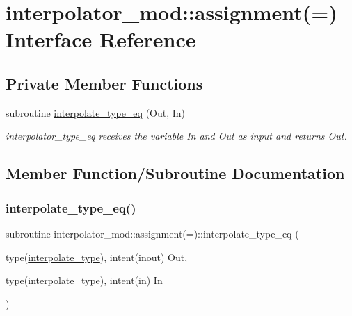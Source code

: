 \hypertarget{interfaceinterpolator__mod_1_1assignment_07_0A_08}{}\section{interpolator\+\_\+mod\+:\+:assignment(=) Interface Reference}
\label{interfaceinterpolator__mod_1_1assignment_07_0A_08}
\subsection*{Private Member Functions}
\begin{DoxyCompactItemize}
\item 
subroutine \hyperlink{interfaceinterpolator__mod_1_1assignment_07_0A_08_a2ddb386877f2abfcce4bc8f209bbcfeb}{interpolate\+\_\+type\+\_\+eq} (Out, In)
\begin{DoxyCompactList}\small\item\em interpolator\+\_\+type\+\_\+eq receives the variable In and Out as input and returns Out. \end{DoxyCompactList}\end{DoxyCompactItemize}


\subsection{Member Function/\+Subroutine Documentation}
\mbox{\label{interfaceinterpolator__mod_1_1assignment_07_0A_08_a2ddb386877f2abfcce4bc8f209bbcfeb}} 
\subsubsection{\texorpdfstring{interpolate\+\_\+type\+\_\+eq()}{interpolate\_type\_eq()}}
{\footnotesize\ttfamily subroutine interpolator\+\_\+mod\+::assignment(=)\+::interpolate\+\_\+type\+\_\+eq (\begin{DoxyParamCaption}\item[{type(\hyperlink{structinterpolator__mod_1_1interpolate__type}{interpolate\+\_\+type}), intent(inout)}]{Out,  }\item[{type(\hyperlink{structinterpolator__mod_1_1interpolate__type}{interpolate\+\_\+type}), intent(in)}]{In }\end{DoxyParamCaption})\hspace{0.3cm}{\ttfamily [private]}}



